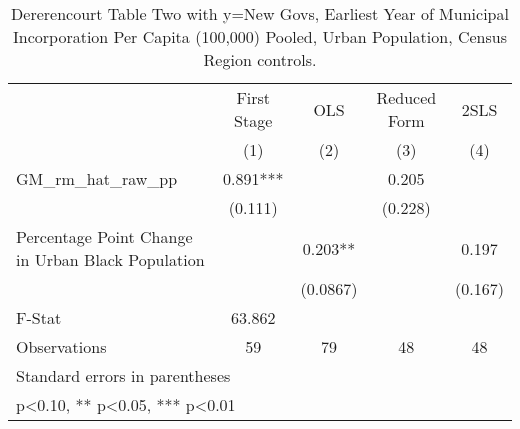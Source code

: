 \begin{table}[htbp]\centering
\def\sym#1{\ifmmode^{#1}\else\(^{#1}\)\fi}
\caption{Dererencourt Table Two with y=New Govs, Earliest Year of Municipal Incorporation Per Capita (100,000) Pooled, Urban Population, Census Region controls.}
\begin{tabular}{l*{4}{c}}
\toprule
                    & First Stage   &         OLS   &Reduced Form   &        2SLS   \\
                    &\multicolumn{1}{c}{(1)}   &\multicolumn{1}{c}{(2)}   &\multicolumn{1}{c}{(3)}   &\multicolumn{1}{c}{(4)}   \\
\midrule
GM\_rm\_hat\_raw\_pp    &       0.891***&               &       0.205   &               \\
                    &     (0.111)   &               &     (0.228)   &               \\
\addlinespace
Percentage Point Change in Urban Black Population&               &       0.203** &               &       0.197   \\
                    &               &    (0.0867)   &               &     (0.167)   \\
\midrule
F-Stat              &      63.862   &               &               &               \\
Observations        &          59   &          79   &          48   &          48   \\
\bottomrule
\multicolumn{5}{l}{\footnotesize Standard errors in parentheses}\\
\multicolumn{5}{l}{\footnotesize * p<0.10, ** p<0.05, *** p<0.01}\\
\end{tabular}
\end{table}
